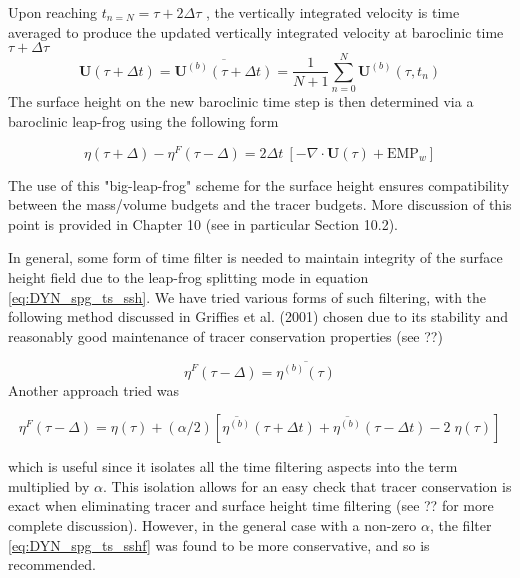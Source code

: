 \documentclass[../tex_main/NEMO_manual]{subfiles}
\begin{document}
Upon reaching $t_{n=N} = \tau + 2\Delta \tau$ , the vertically integrated velocity is time averaged to produce the updated vertically integrated velocity at baroclinic time $\tau + \Delta \tau$ 
\begin{equation} \label{eq:DYN_spg_ts_u}
\textbf{U}(\tau+\Delta t) = \overline{\textbf{U}^{(b)}(\tau+\Delta t)} 
 	= \frac{1}{N+1} \sum\limits_{n=0}^N\textbf{U}^{(b)}(\tau,t_{n})
\end{equation}
The surface height on the new baroclinic time step is then determined via a baroclinic leap-frog using the following form 

\begin{equation} \label{eq:DYN_spg_ts_ssh}
\eta(\tau+\Delta) - \eta^{F}(\tau-\Delta) = 2\Delta t \ \left[ - \nabla \cdot \textbf{U}(\tau) + \text{EMP}_w \right]  
\end{equation}

 The use of this "big-leap-frog" scheme for the surface height ensures compatibility between the mass/volume budgets and the tracer budgets. More discussion of this point is provided in Chapter 10 (see in particular Section 10.2). 
 
In general, some form of time filter is needed to maintain integrity of the surface 
height field due to the leap-frog splitting mode in equation \autoref{eq:DYN_spg_ts_ssh}. We 
have tried various forms of such filtering, with the following method discussed in 
Griffies et al. (2001) chosen due to its stability and reasonably good maintenance of 
tracer conservation properties (see ??) 

\begin{equation} \label{eq:DYN_spg_ts_sshf}
\eta^{F}(\tau-\Delta) =  \overline{\eta^{(b)}(\tau)} 
\end{equation}
Another approach tried was 

\begin{equation} \label{eq:DYN_spg_ts_sshf2}
\eta^{F}(\tau-\Delta) = \eta(\tau) 
	+ (\alpha/2) \left[\overline{\eta^{(b)}}(\tau+\Delta t)
				    + \overline{\eta^{(b)}}(\tau-\Delta t) -2 \;\eta(\tau) \right]
\end{equation}

which is useful since it isolates all the time filtering aspects into the term multiplied 
by $\alpha$. This isolation allows for an easy check that tracer conservation is exact when 
eliminating tracer and surface height time filtering (see ?? for more complete discussion). However, in the general case with a non-zero $\alpha$, the filter \autoref{eq:DYN_spg_ts_sshf} was found to be more conservative, and so is recommended. 
\end{document}
